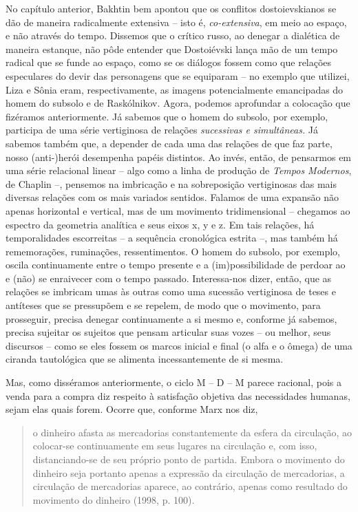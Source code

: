 No capítulo anterior, Bakhtin bem apontou que os conflitos
dostoievskianos se dão de maneira radicalmente extensiva -- isto é,
\emph{co-extensiva}, em meio ao espaço, e não através do tempo. Dissemos
que o crítico russo, ao denegar a dialética de maneira estanque, não
pôde entender que Dostoiévski lança mão de um tempo radical que se funde
ao espaço, como se os diálogos fossem como que relações especulares do
devir das personagens que se equiparam -- no exemplo que utilizei, Liza
e Sônia eram, respectivamente, as imagens potencialmente emancipadas do
homem do subsolo e de Raskólnikov. Agora, podemos aprofundar a colocação
que fizéramos anteriormente. Já sabemos que o homem do subsolo, por
exemplo, participa de uma série vertiginosa de relações \emph{sucessivas
e simultâneas.} Já sabemos também que, a depender de cada uma das
relações de que faz parte, nosso (anti-)herói desempenha papéis
distintos. Ao invés, então, de pensarmos em uma série relacional linear
-- algo como a linha de produção de \emph{Tempos Modernos}, de Chaplin
--, pensemos na imbricação e na sobreposição vertiginosas das mais
diversas relações com os mais variados sentidos. Falamos de uma expansão
não apenas horizontal e vertical, mas de um movimento tridimensional --
chegamos ao espectro da geometria analítica e seus eixos x, y e z. Em
tais relações, há temporalidades escorreitas -- a sequência cronológica
estrita --, mas também há rememorações, ruminações, ressentimentos. O
homem do subsolo, por exemplo, oscila continuamente entre o tempo
presente e a (im)possibilidade de perdoar ao e (não) se enraivecer com o
tempo passado. Interessa-nos dizer, então, que as relações se imbricam
umas às outras como uma sucessão vertiginosa de teses e antíteses que se
pressupõem e se repelem, de modo que o movimento, para prosseguir,
precisa denegar continuamente a si mesmo e, conforme já sabemos, precisa
sujeitar os sujeitos que pensam articular suas vozes -- ou melhor, seus
discursos -- como se eles fossem os marcos inicial e final (o alfa e o
ômega) de uma ciranda tautológica que se alimenta incessantemente de si
mesma.

Mas, como disséramos anteriormente, o ciclo M -- D -- M parece racional,
pois a venda para a compra diz respeito à satisfação objetiva das
necessidades humanas, sejam elas quais forem. Ocorre que, conforme Marx
nos diz,

\begin{quote}
o dinheiro afasta as mercadorias constantemente da esfera da circulação,
ao colocar-se continuamente em seus lugares na circulação e, com isso,
distanciando-se de seu próprio ponto de partida. Embora o movimento do
dinheiro seja portanto apenas a expressão da circulação de mercadorias,
a circulação de mercadorias aparece, ao contrário, apenas como resultado
do movimento do dinheiro (1998, p. 100).
\end{quote}

